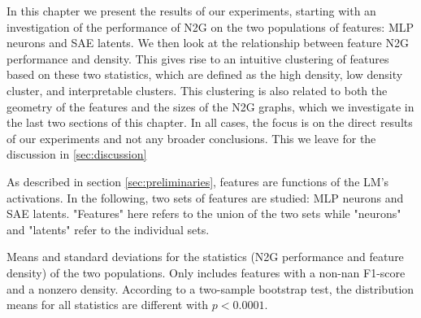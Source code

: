 In this chapter we present the results of our experiments, starting with an investigation of the performance of \ac{N2G} on the two populations of features: \ac{MLP} neurons and \ac{SAE} latents.
We then look at the relationship between feature \ac{N2G} performance and density.
This gives rise to an intuitive clustering of features based on these two statistics, which are defined as the high density, low density cluster, and interpretable clusters.
This clustering is also related to both the geometry of the features and the sizes of the \ac{N2G} graphs, which we investigate in the last two sections of this chapter.
In all cases, the focus is on the direct results of our experiments and not any broader conclusions.
This we leave for the discussion in \autoref{sec:discussion}

As described in section \ref{sec:preliminaries}, features are functions of the \ac{LM}'s activations.
In the following, two sets of features are studied: \ac{MLP} neurons and \ac{SAE} latents.
"Features" here refers to the union of the two sets while "neurons" and "latents" refer to the individual sets.



\begin{table}[ht]
    \centering
    
    \caption{Means and standard deviations for the statistics (N2G performance and feature density) of the two populations. Only includes features with a non-nan F1-score and a nonzero density. According to a two-sample bootstrap test, the distribution means for all statistics are different with $p<0.0001$.}
    \label{tab:distributions}
\end{table}

